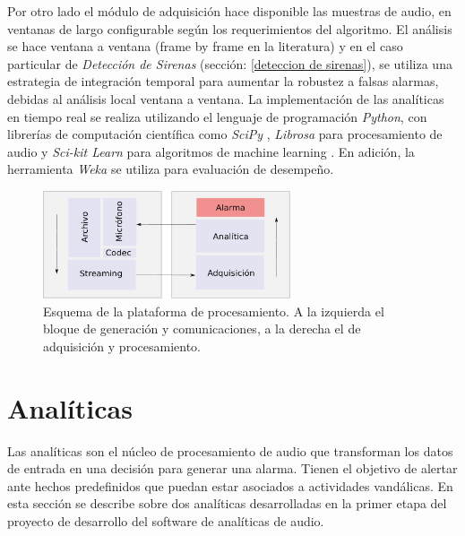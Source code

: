 \documentclass{article}
\begin{document}
Por otro lado el módulo de adquisición hace disponible las muestras de audio, en ventanas de largo configurable según los requerimientos del algoritmo. El análisis se hace ventana a ventana (frame by frame en la literatura) y en el caso particular de \textit{Detección de Sirenas} (sección: \ref{deteccion de sirenas}), se utiliza una estrategia de integración temporal para aumentar la robustez a falsas alarmas, debidas al análisis local ventana a ventana. La implementación de las analíticas en tiempo real se realiza utilizando el lenguaje de programación \textit{Python}, con librerías de computación científica como \textit{SciPy} \citep{jones2001open}, \textit{Librosa} \citep{mcfee2015librosa} para procesamiento de audio y \textit{Sci-kit Learn} para algoritmos de machine learning \citep{pedregosa2011scikit}. En adición, la herramienta \textit{Weka} \citep{hall2009weka} se utiliza para evaluación de desempeño.  


\begin{figure}[h]
\begin{center}
\includegraphics[width=0.65\textwidth]{plataforma_procesamiento} 
\caption{Esquema de la plataforma de procesamiento. A la izquierda el bloque de generación y comunicaciones, a la derecha el de adquisición y procesamiento.}
\label{fig:plataforma_procesamiento}
\end{center}
\end{figure}


\section{Analíticas}
\label{analiticas}
Las analíticas son el núcleo de procesamiento de audio que transforman los datos de entrada en una decisión para generar una alarma. Tienen el objetivo de alertar ante hechos predefinidos que puedan estar asociados a actividades vandálicas. En esta sección se describe sobre dos analíticas desarrolladas en la primer etapa del proyecto de desarrollo del software de analíticas de audio. 
\end{document}
